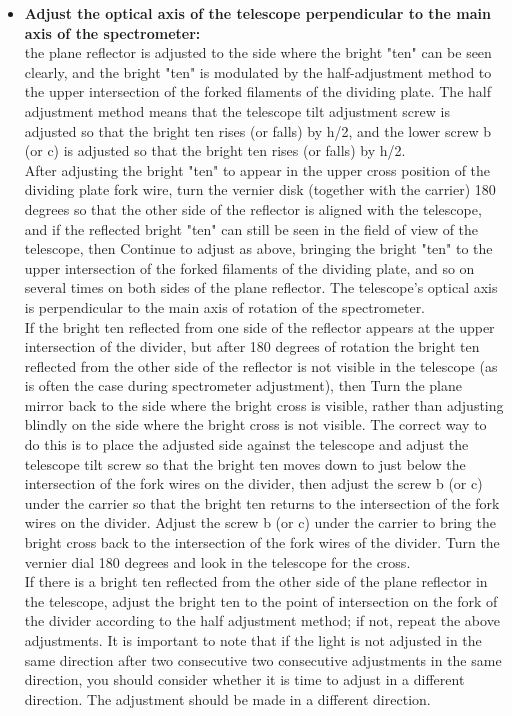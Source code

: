 \documentclass[UTF8]{article}
\begin{document}
\begin{itemize}
                     \item \textbf{Adjust the optical axis of the telescope perpendicular to the main axis of the spectrometer:} \\
                     the plane reflector is adjusted to the side where the bright "ten" can be seen clearly, and the bright "ten" is modulated by the half-adjustment method to the upper intersection of the forked filaments of the dividing plate. The half adjustment method means that the telescope tilt adjustment screw is adjusted so that the bright ten rises (or falls) by h/2, and the lower screw b (or c) is adjusted so that the bright ten rises (or falls) by h/2.\\
                     After adjusting the bright "ten" to appear in the upper cross position of the dividing plate fork wire, turn the vernier disk (together with the carrier) 180 degrees so that the other side of the reflector is aligned with the telescope, and if the reflected bright "ten" can still be seen in the field of view of the telescope, then Continue to adjust as above, bringing the bright "ten" to the upper intersection of the forked filaments of the dividing plate, and so on several times on both sides of the plane reflector.
                     The telescope's optical axis is perpendicular to the main axis of rotation of the spectrometer.\\
                     If the bright ten reflected from one side of the reflector appears at the upper intersection of the divider, but after 180 degrees of rotation the bright ten reflected from the other side of the reflector is not visible in the telescope (as is often the case during spectrometer adjustment), then Turn the plane mirror back to the side where the bright cross is visible, rather than adjusting blindly on the side where the bright cross is not visible. The correct way to do this is to place the adjusted side against the telescope and adjust the telescope tilt screw so that the bright ten moves down to just below the intersection of the fork wires on the divider, then adjust the screw b (or c) under the carrier so that the bright ten returns to the intersection of the fork wires on the divider. Adjust the screw b (or c) under the carrier to bring the bright cross back to the intersection of the fork wires of the divider. Turn the vernier dial 180 degrees and look in the telescope for the cross.\\
                     If there is a bright ten reflected from the other side of the plane reflector in the telescope, adjust the bright ten to the point of intersection on the fork of the divider according to the half adjustment method; if not, repeat the above adjustments. It is important to note that if the light is not adjusted in the same direction after two consecutive two consecutive adjustments in the same direction, you should consider whether it is time to adjust in a different direction. The adjustment should be made in a different direction.
        \end{itemize} 
\end{document}
